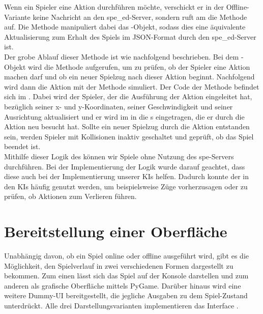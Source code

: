 Wenn ein Spieler eine Aktion durchführen möchte, verschickt er in der Offline-Variante keine Nachricht an den spe\_ed-Server,
sondern ruft am  die Methode  auf.
Die Methode manipuliert dabei das -Objekt, sodass dies eine äquivalente Aktualisierung zum Erhalt des Spiels
im JSON-Format durch den spe\_ed-Server ist. \\

Der grobe Ablauf dieser Methode ist wie nachfolgend beschrieben.
Bei dem -Objekt wird die Methode  aufgerufen, um zu prüfen, ob der Spieler eine
Aktion machen darf und ob ein neuer Spielzug nach dieser Aktion beginnt.
Nachfolgend wird dann die Aktion mit der Methode 
simuliert.
Der Code der Methode befindet sich im .
Dabei wird der Spieler, der die Ausführung der Aktion eingeleitet hat, bezüglich seiner x- und y-Koordinaten,
seiner Geschwindigkeit und seiner Ausrichtung aktualisiert und er wird im  in die s eingetragen,
die er durch die Aktion neu besucht hat.
Sollte ein neuer Spielzug durch die Aktion entstanden sein, werden Spieler mit Kollisionen inaktiv geschaltet und
geprüft, ob das Spiel beendet ist. \\

Mithilfe dieser Logik des  können wir Spiele ohne Nutzung des spe\ed-Servers durchführen.
Bei der Implementierung der Logik wurde darauf geachtet, dass diese auch bei der Implementierung unserer \ac{KI}s
helfen.
Dadurch konnte der  in den \ac{KI}s häufig genutzt werden, um beispielsweise Züge vorherzusagen oder
zu prüfen, ob Aktionen zum Verlieren führen.

\section{Bereitstellung einer Oberfläche}
\label{sec:bereitstellung-oberflaeche}

Unabhängig davon, ob ein Spiel online oder offline ausgeführt wird, gibt es die Möglichkeit, den Spielverlauf in zwei
verschiedenen Formen dargestellt zu bekommen.
Zum einen lässt sich das Spiel auf der Konsole darstellen und zum anderen als grafische Oberfläche mittels PyGame.
Darüber hinaus wird eine weitere Dummy-UI bereitgestellt, die jegliche Ausgaben zu dem Spiel-Zustand unterdrückt.
Alle drei Darstellungsvarianten implementieren das Interface .

